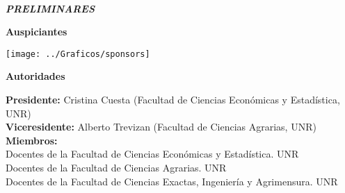 \clearpage
\newpage
\noindent\\

\thispagestyle{empty}
 \begin{center}
  \Large
   \begin{flushright}
   \vspace{17cm} {\Huge \em{ \textbf{PRELIMINARES}}} \\ [0.5cm]
   \end{flushright}
   \normalsize
 \end{center}
\small
\clearpage


\clearpage
\newpage
\thispagestyle{empty}


\newpage
\noindent
\pagestyle{fancy}
\setlength\parindent{16pt}

\vspace*{1cm}
\centerline{\textbf{\LARGE{Auspiciantes}}}

\begin{center} \setlength{\unitlength}{1cm}
  \texttt{[image: ../Graficos/sponsors]}
\end{center}


\clearpage
\newpage
\pagestyle{fancy}

\vspace*{1cm}

\centerline{\textbf{\LARGE{Autoridades}}}

\vspace{1cm}

{}
\bigbreak
\noindent \textbf {Presidente:} Cristina Cuesta (Facultad de Ciencias Económicas y Estadística, UNR) \\
\textbf {Viceresidente:} Alberto Trevizan (Facultad de Ciencias Agrarias, UNR) \\
\textbf {Miembros:} \\
Docentes de la Facultad de Ciencias Económicas y Estadística. UNR \\
Docentes de la Facultad de Ciencias Agrarias. UNR \\
Docentes de la Facultad de Ciencias Exactas, Ingeniería y Agrimensura. UNR \\

